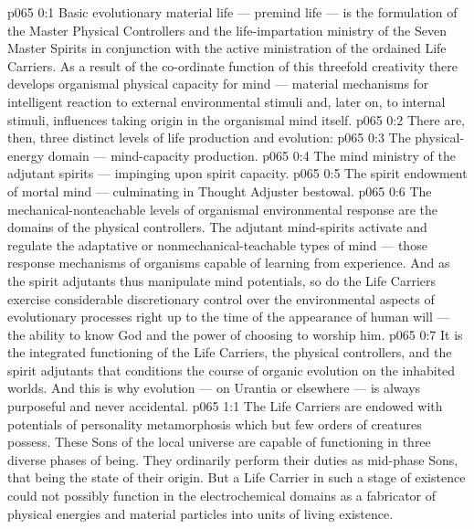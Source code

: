 \author{Life Carrier}
\vs p065 0:1 Basic evolutionary material life --- premind life --- is the formulation of the Master Physical Controllers and the life\hyp{}impartation ministry of the Seven Master Spirits in conjunction with the active ministration of the ordained Life Carriers. As a result of the co\hyp{}ordinate function of this threefold creativity there develops organismal physical capacity for mind --- material mechanisms for intelligent reaction to external environmental stimuli and, later on, to internal stimuli, influences taking origin in the organismal mind itself.
\vs p065 0:2 \pc There are, then, three distinct levels of life production and evolution:
\vs p065 0:3 \bibnobreakspace The physical\hyp{}energy domain --- mind\hyp{}capacity production.
\vs p065 0:4 \bibnobreakspace The mind ministry of the adjutant spirits --- impinging upon spirit capacity.
\vs p065 0:5 \bibnobreakspace The spirit endowment of mortal mind --- culminating in Thought Adjuster bestowal.
\vs p065 0:6 \pc The mechanical\hyp{}nonteachable levels of organismal environmental response are the domains of the physical controllers. The adjutant mind\hyp{}spirits activate and regulate the adaptative or nonmechanical\hyp{}teachable types of mind --- those response mechanisms of organisms capable of learning from experience. And as the spirit adjutants thus manipulate mind potentials, so do the Life Carriers exercise considerable discretionary control over the environmental aspects of evolutionary processes right up to the time of the appearance of human will --- the ability to know God and the power of choosing to worship him.
\vs p065 0:7 It is the integrated functioning of the Life Carriers, the physical controllers, and the spirit adjutants that conditions the course of organic evolution on the inhabited worlds. And this is why evolution --- on Urantia or elsewhere --- is always purposeful and never accidental.
\vs p065 1:1 The Life Carriers are endowed with potentials of personality metamorphosis which but few orders of creatures possess. These Sons of the local universe are capable of functioning in three diverse phases of being. They ordinarily perform their duties as mid\hyp{}phase Sons, that being the state of their origin. But a Life Carrier in such a stage of existence could not possibly function in the electrochemical domains as a fabricator of physical energies and material particles into units of living existence.
